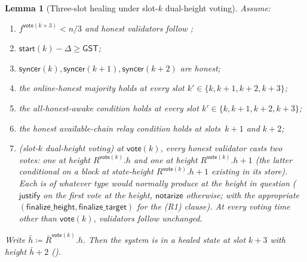 \ifx\litemode\undefined\documentclass{article}\fi
\newcommand{\just}{\ensuremath{\mathsf{justify}}\xspace}
\newcommand{\notar}{\ensuremath{\mathsf{notarize}}\xspace}
\newcommand{\finalizeHeight}{\mathsf{finalize\_height}}
\newcommand{\finalizeTarget}{\mathsf{finalize\_target}}
\newcommand{\syncer}{\mathsf{syncer}}
\newcommand{\start}{\mathsf{start}}
\newcommand{\vote}{\mathsf{vote}}
\newcommand{\comm}[1]{\bar{#1}}
\theoremstyle{plain}
\newtheorem{lemma}{Lemma}
\theoremstyle{definition}
\theoremstyle{remark}
\newcommand{\GST}{\ensuremath{\mathsf{GST}}}
\newcommand{\OHM}{online-honest majority\xspace}
\newcommand{\HAR}{honest available-chain relay\xspace}
\newcommand{\AHA}{all-honest-awake\xspace}
\begin{document}
\begin{lemma}[Three-slot healing under slot-$k$ dual-height voting]\label{rev:lem:healing-three-slot-dual-vote}
Assume:
\begin{enumerate}
  \item $f^{\vote(k+3)} < n/3$ and honest validators follow ;
  \item $\start(k) - \Delta \geq \GST$;
  \item $\syncer(k), \syncer(k+1), \syncer(k+2)$ are honest;
  \item the \OHM holds at every slot $k' \in \{k, k+1, k+2, k+3\}$;
  \item the \AHA condition holds at every slot $k' \in \{k, k+1, k+2, k+3\}$;
  \item the \HAR condition holds at slots~$k+1$ and $k+2$;
  \item (\emph{slot-$k$ dual-height voting}) at $\vote(k)$, every honest validator casts \emph{two} votes: one at height $R^{\vote(k)}.h$ and one at height $R^{\vote(k)}.h + 1$ (the latter conditional on a block at state-height $R^{\vote(k)}.h + 1$ existing in its store). Each is of whatever type  would normally produce at the height in question (\just on the first vote at the height, \notar otherwise; with the appropriate $(\finalizeHeight, \finalizeTarget)$ for the (R1) clause). At every voting time other than $\vote(k)$, validators follow  unchanged.
\end{enumerate}
Write $\comm{h} \coloneqq \comm{R}^{\vote(k)}.h$. Then the system is in a healed state at slot $k+3$ with height $\comm{h}+2$ ().
\end{lemma}
\end{document}
